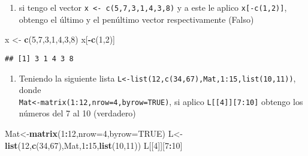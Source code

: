 \documentclass[]{article}
\newenvironment{Shaded}{\begin{snugshade}}{\end{snugshade}}
\newcommand{\KeywordTok}[1]{\textcolor[rgb]{0.13,0.29,0.53}{\textbf{#1}}}
\newcommand{\DataTypeTok}[1]{\textcolor[rgb]{0.13,0.29,0.53}{#1}}
\newcommand{\DecValTok}[1]{\textcolor[rgb]{0.00,0.00,0.81}{#1}}
\newcommand{\StringTok}[1]{\textcolor[rgb]{0.31,0.60,0.02}{#1}}
\newcommand{\OtherTok}[1]{\textcolor[rgb]{0.56,0.35,0.01}{#1}}
\newcommand{\OperatorTok}[1]{\textcolor[rgb]{0.81,0.36,0.00}{\textbf{#1}}}
\newcommand{\NormalTok}[1]{#1}
\providecommand{\tightlist}{%
  \setlength{\itemsep}{0pt}\setlength{\parskip}{0pt}}
\begin{document}
\begin{enumerate}
\def\labelenumi{\alph{enumi}.}
\tightlist
\item
  si tengo el vector \texttt{x\ \textless{}-\ c(5,7,3,1,4,3,8)} y a este
  le aplico \texttt{x{[}-c(1,2){]}}, obtengo el último y el penúltimo
  vector respectivamente (Falso)
\end{enumerate}

\begin{Shaded}
\begin{Highlighting}[]
\NormalTok{x <-}\StringTok{ }\KeywordTok{c}\NormalTok{(}\DecValTok{5}\NormalTok{,}\DecValTok{7}\NormalTok{,}\DecValTok{3}\NormalTok{,}\DecValTok{1}\NormalTok{,}\DecValTok{4}\NormalTok{,}\DecValTok{3}\NormalTok{,}\DecValTok{8}\NormalTok{)}
\NormalTok{x[}\OperatorTok{-}\KeywordTok{c}\NormalTok{(}\DecValTok{1}\NormalTok{,}\DecValTok{2}\NormalTok{)]}
\end{Highlighting}
\end{Shaded}

\begin{verbatim}
## [1] 3 1 4 3 8
\end{verbatim}

\begin{enumerate}
\def\labelenumi{\alph{enumi}.}
\setcounter{enumi}{1}
\tightlist
\item
  Teniendo la siguiente lista
  \texttt{L\textless{}-list(12,c(34,67),Mat,1:15,list(10,11))}, donde\\
  \texttt{Mat\textless{}-matrix(1:12,nrow=4,byrow=TRUE)}, si aplico
  \texttt{L{[}{[}4{]}{]}{[}7:10{]}} obtengo los números del 7 al 10
  (verdadero)
\end{enumerate}

\begin{Shaded}
\begin{Highlighting}[]
\NormalTok{Mat<-}\KeywordTok{matrix}\NormalTok{(}\DecValTok{1}\OperatorTok{:}\DecValTok{12}\NormalTok{,}\DataTypeTok{nrow=}\DecValTok{4}\NormalTok{,}\DataTypeTok{byrow=}\OtherTok{TRUE}\NormalTok{)}
\NormalTok{L<-}\KeywordTok{list}\NormalTok{(}\DecValTok{12}\NormalTok{,}\KeywordTok{c}\NormalTok{(}\DecValTok{34}\NormalTok{,}\DecValTok{67}\NormalTok{),Mat,}\DecValTok{1}\OperatorTok{:}\DecValTok{15}\NormalTok{,}\KeywordTok{list}\NormalTok{(}\DecValTok{10}\NormalTok{,}\DecValTok{11}\NormalTok{))}
\NormalTok{L[[}\DecValTok{4}\NormalTok{]][}\DecValTok{7}\OperatorTok{:}\DecValTok{10}\NormalTok{]}
\end{Highlighting}
\end{Shaded}
\end{document}
